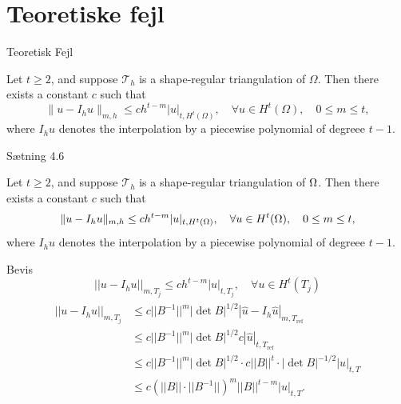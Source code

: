 \section{Teoretiske fejl}
\begin{frame}{Teoretisk Fejl}
\begin{theorem}
    Let $t \geq 2$, and suppose $\mathcal{T}_h$ is a shape-regular triangulation of $\Omega$. Then there exists a constant $c$ such that
    \begin{equation*}
        \|u - I_h u\|_{m,h} \leq c h^{t-m} |u|_{t, H^t(\Omega)}, \quad \forall u \in H^t(\Omega), \quad 0 \leq m \leq t,
    \end{equation*}
    where $I_h u$ denotes the interpolation by a piecewise polynomial of degreee $t-1$.
\end{theorem}
\end{frame}
\iffalse
\begin{frame}{Sætning 4.6}{}
    \begin{theorem}
    Let $t \geq 2$, and suppose $\mathcal{T}_h$ is a shape-regular triangulation of $\Omega$. Then there exists a constant $c$ such that
    \begin{equation}
        \|u - I_h u\| _{m,h} \leq c h^{t-m} |u|_{t, H^t(\Omega)}, \quad \forall u \in H^t(\Omega), \quad 0 \leq m \leq t,
    \end{equation}
    where $I_h u$ denotes the interpolation by a piecewise polynomial of degreee $t-1$.
    \end{theorem}
\end{frame}
\begin{frame}{Bevis}
    \begin{equation}
        ||u-I_h u||_{m,T_j} \leq c h^{t-m} |u|_{t,T_j}, \quad \forall u \in H^t(T_j)
    \end{equation}
    \begin{align}
        \begin{split}
        ||u-I_h u||_{m,T_j} &\leq c ||B^{-1}||^m |\det B |^{1/2} |\hat{u} - I_h \hat{u}|_{m,T_{\text{ref}}} \\
                            &\leq c ||B^{-1}||^m |\det B |^{1/2} c | \hat{u} |_{t,T_{\text{ref}}} \\
                            &\leq c ||B^{-1}||^m |\det B |^{1/2} \cdot c ||B||^t \cdot |\det B |^{-1/2} |u|_{t,T}  \\
                         &\leq c {\left( ||B||  \cdot ||B^{-1}|| \right)}^m ||B||^{t-m} |u|_{t,T}.
        \end{split}
    \end{align}
\end{frame}
